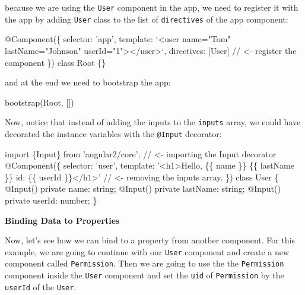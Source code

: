 \documentclass[12pt,]{article}
\newenvironment{Shaded}{}{}
\newcommand{\KeywordTok}[1]{\textcolor[rgb]{0.00,0.00,1.00}{{#1}}}
\newcommand{\StringTok}[1]{\textcolor[rgb]{0.00,0.50,0.50}{{#1}}}
\newcommand{\CommentTok}[1]{\textcolor[rgb]{0.00,0.50,0.00}{{#1}}}
\newcommand{\FunctionTok}[1]{{#1}}
\newcommand{\NormalTok}[1]{{#1}}
\begin{document}
because we are using the \texttt{User} component in the app, we need to
register it with the app by adding \texttt{User} class to the list of
\texttt{directives} of the app component:

\begin{Shaded}
\begin{Highlighting}[numbers=left,,]
\FunctionTok{@Component}\NormalTok{(\{}
  \NormalTok{selector: 'app',}
  \NormalTok{template: `<user name=}\StringTok{"Tom"} \NormalTok{lastName=}\StringTok{"Johnson"} \NormalTok{userId=}\StringTok{"1"}\NormalTok{></user>`,}
  \NormalTok{directives: [User] }\CommentTok{// <- register the component}
\NormalTok{\})}
\KeywordTok{class} \NormalTok{Root \{\}}
\end{Highlighting}
\end{Shaded}

and at the end we need to bootstrap the app:

\begin{Shaded}
\begin{Highlighting}[numbers=left,,]
\FunctionTok{bootstrap}\NormalTok{(Root, [])}
\end{Highlighting}
\end{Shaded}

Now, notice that instead of adding the inputs to the \texttt{inputs}
array, we could have decorated the instance variables with the
\texttt{@Input} decorator:

\begin{Shaded}
\begin{Highlighting}[numbers=left,,]
\KeywordTok{import \{Input\} from 'angular2/core';} \CommentTok{// <- importing the Input decorator}
\FunctionTok{@Component}\NormalTok{(\{}
  \NormalTok{selector: 'user',}
  \NormalTok{template: '<h1>Hello, \{\{ name \}\} \{\{ lastName \}\} id: \{\{ userId \}\}</h1>'}
  \CommentTok{// <- removing the inputs array.}
\NormalTok{\})}
\KeywordTok{class} \NormalTok{User \{}
  \FunctionTok{@Input}\NormalTok{() }\KeywordTok{private} \NormalTok{name: string;}
  \FunctionTok{@Input}\NormalTok{() }\KeywordTok{private} \NormalTok{lastName: string;}
  \FunctionTok{@Input}\NormalTok{() }\KeywordTok{private} \NormalTok{userId: number;}
\NormalTok{\}}
\end{Highlighting}
\end{Shaded}

\textbf{Binding Data to Properties}

Now, let's see how we can bind to a property from another component. For
this example, we are going to continue with our \texttt{User} component
and create a new component called \texttt{Permission}. Then we are going
to use the the \texttt{Permission} component inside the \texttt{User}
component and set the \texttt{uid} of \texttt{Permission} by the
\texttt{userId} of the \texttt{User}.
\end{document}
